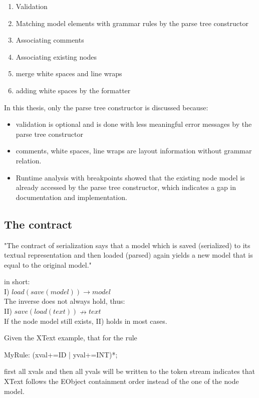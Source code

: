 \begin{enumerate}
	\item Validation
	\item Matching model elements with grammar rules by the parse tree constructor
	\item Associating comments
	\item Associating existing nodes
	\item merge white spaces and line wraps
	\item adding white spaces by the formatter
\end{enumerate}

In this thesis, only the parse tree constructor is discussed because:
\begin{itemize}
	\item validation is optional and is done with less meaningful error messages by the parse tree constructor
	\item comments, white spaces, line wraps are layout information without grammar relation.
	\item Runtime analysis with breakpoints showed that the existing node model is already accessed by the parse tree constructor, which indicates a gap in documentation and implementation.
\end{itemize}

\subsection{The contract}
"The contract of serialization says that a model which is saved (serialized) to its textual representation and then loaded (parsed) again yields a new model that is equal to the original model."\cite{XTextMan}

in short:\\
I) $load(save(model)) \rightarrow model$\\
The inverse does not always hold, thus:\\
II) $save(load(text)) \nrightarrow text$\\
If the node model still exists, II) holds in most cases. 

Given the XText example, that for the rule
\begin{xtxt}
MyRule: (xval+=ID | yval+=INT)*; 
\end{xtxt}
first all xvals and then all yvals will be written to the token stream indicates that XText follows the  EObject containment order instead of the one of the node model.

